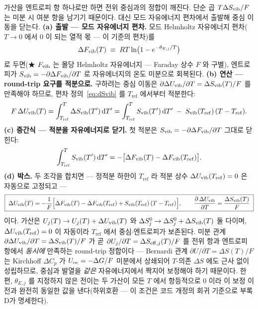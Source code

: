 가산을 엔트로피 항 하나로만 하면 전위 중심과의 정합이 깨진다. 단순 곱 $T\Delta S_{\mathrm{vib}}/F$ 는 미분 시 여분
항을 남기기 때문이다. 대신 모드 자유에너지 편차에서 출발해 중심 이동을 닫는다.
\textbf{(a) 출발 --- 모드 자유에너지 편차.} 모드 Helmholtz 자유에너지 편차($T\!\to\!0$ 에서 $0$ 이 되는
열적 몫 --- 이 기준의 편차)를
\[
\Delta F_{\mathrm{vib}}(T)\;\equiv\; RT\ln\bigl(1-e^{-\theta_{E,j}/T}\bigr)
\]
로 두면(★ $F_{\mathrm{vib}}$ 는 몰당 Helmholtz 자유에너지 --- Faraday 상수 $F$ 와 구별), 엔트로피가 $S_{\mathrm{vib}}=-\partial
\Delta F_{\mathrm{vib}}/\partial T$ 로 자유에너지의 온도 미분으로 회복된다. \textbf{(b) 연산 --- round-trip 요구를
적분으로.} 구하려는 중심 이동은 $\partial\Delta U_{\mathrm{vib}}/\partial T=\Delta S_{\mathrm{vib}}(T)/F$ 를 만족해야 하므로,
편차 정의~\eqref{eq:dSvib} 를 $T_\mathrm{ref}$ 에서부터 적분한다:
\[
F\,\Delta U_{\mathrm{vib}}(T)=\int_{T_\mathrm{ref}}^{T}\Delta S_{\mathrm{vib}}(T')\,\mathrm{d} T'
=\int_{T_\mathrm{ref}}^{T}S_{\mathrm{vib}}(T')\,\mathrm{d} T'\;-\;S_{\mathrm{vib}}(T_\mathrm{ref})\,(T-T_\mathrm{ref}).
\]
\textbf{(c) 중간식 --- 적분을 자유에너지로 닫기.} 첫 적분은 $S_{\mathrm{vib}}=-\partial\Delta F_{\mathrm{vib}}/\partial T$
그대로 닫힌다:
\[
\int_{T_\mathrm{ref}}^{T}S_{\mathrm{vib}}(T')\,\mathrm{d} T'
=-\bigl[\Delta F_{\mathrm{vib}}(T)-\Delta F_{\mathrm{vib}}(T_\mathrm{ref})\bigr].
\]
\textbf{(d) 박스.} 두 조각을 합치면 --- 정적분 하한이 $T_\mathrm{ref}$ 라 적분 상수
$\Delta U_{\mathrm{vib}}(T_\mathrm{ref})=0$ 은 자동으로 고정되고 ---
\begin{equation}
\boxed{\;
\Delta U_{\mathrm{vib}}(T)=-\frac1F\Bigl[\Delta F_{\mathrm{vib}}(T)-\Delta F_{\mathrm{vib}}(T_\mathrm{ref})+S_{\mathrm{vib}}(T_\mathrm{ref})\,(T-T_\mathrm{ref})\Bigr],
\qquad
\frac{\partial\,\Delta U_{\mathrm{vib}}}{\partial T}=\frac{\Delta S_{\mathrm{vib}}(T)}{F}\;}
\label{eq:dUvib}
\end{equation}
이다. 가산은 $U_j(T)\to U_j(T)+\Delta U_{\mathrm{vib}}(T)$ 와 $\Delta S^0_j\to\Delta S^0_j+\Delta S_{\mathrm{vib}}(T)$ 둘 다이며,
$\Delta U_{\mathrm{vib}}(T_\mathrm{ref})=0$ 이 자동이라 $T_\mathrm{ref}$ 에서 중심$\cdot$엔트로피가 보존된다. 미분 관계
$\partial\Delta U_{\mathrm{vib}}/\partial T=\Delta S_{\mathrm{vib}}(T)/F$ 가 곧 $\partial U_j/\partial T=\Delta S_{\mathrm{eff},j}(T)/F$ 를 전위
항과 엔트로피 항에서 \emph{동시에} 만족하는 round-trip 정합이다 --- Bernardi 관계 $\partial U/\partial
T=\Delta S(T)/F$ 는 Kirchhoff $\Delta C_p$ 가 $U_{\mathrm{oc}}={-}\Delta G/F$ 미분에서 상쇄되어 $T$-의존 $\Delta S$ 에도
근사 없이 성립하므로, 중심과 발열을 \emph{같은} 자유에너지에서 짝지어 보정해야 하기 때문이다. 한편,
$\theta_{E,j}$ 를 지정하지 않은 전이는 두 가산이 모든 $T$ 에서 항등적으로 $0$ 이라 이 보정 이전과 완전히
동일한 값을 낸다(하위호환 --- 이 조건은 코드 개정의 회귀 기준으로 부록 D가 명세한다).

